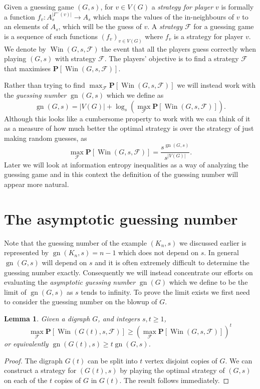 \documentclass[a4paper, 14pt]{extarticle}
\theoremstyle{plain}
\newtheorem{lemma}[proposition]{Lemma}
\def\mc{\mathcal}
\def\mb{\mathbf}
\DeclareMathOperator{\gn}{gn}
\DeclareMathOperator{\Win}{Win}
\begin{document}
Given a guessing game $(G,s)$, for $v\in V(G)$ a \emph{strategy for
player $v$} is formally a function $f_v:A_s^{|\Gamma^-(v)|}\to A_s$
which maps the values of the in-neighbours of $v$ to an elements of $A_s$, which will be the guess of $v$. A
\emph{strategy} $\mc{F}$ for a guessing game is a sequence of such
functions $(f_v)_{v\in V(G)}$ where $f_v$ is a strategy for player
$v$. We denote by $\Win(G,s,\mc{F})$ the event that all the players guess
correctly when playing $(G,s)$ with strategy $\mc{F}$. The players'
objective is to find a strategy $\mc{F}$ that maximises
$\mb{P}[\Win(G,s,\mc{F})]$.

Rather than trying to find $\max_{\mc{F}}\mb{P}[\Win(G,s,\mc{F})]$ we
will instead work with the \emph{guessing number} $\gn(G,s)$ which
we define as
\[
\gn(G,s) = |V(G)|+\log_s
\left(\max_{\mc{F}}\mb{P}[\Win(G,s,\mc{F})]\right).
\]
Although this looks like a cumbersome property to work with we can
think of it as a measure of how much better the optimal strategy is
over the strategy of just making random guesses, as
\[
\max_{\mc{F}}\mb{P}[\Win(G,s,\mc{F})] =
\frac{s^{\gn(G,s)}}{s^{|V(G)|}}.
\]
Later we will look at information entropy inequalities as a way of
analyzing the guessing game and in this context the definition of
the guessing number will appear more natural.

\section{The asymptotic guessing number}\label{Sec:Asymptotic}

Note that the guessing number of the example $(K_n,s)$ we
discussed earlier is represented by $\gn(K_n,s) = n-1$ which does
not depend on $s$. In general $\gn(G,s)$ will depend on $s$ and it
is often extremely difficult to determine the guessing number
exactly. Consequently we will instead concentrate our efforts on
evaluating the \emph{asymptotic guessing number} $\gn(G)$ which we
define to be the limit of $\gn(G,s)$ as $s$ tends to infinity. To
prove the limit exists we first need to consider the guessing number
on the blowup of $G$.

\begin{lemma}\label{Lem:BlowupIneq}
Given a digraph $G$, and integers $s, t\geq 1$,
\[
\max_{\mc{F}}\mb{P}[\Win(G(t),s,\mc{F})] \geq
\left(\max_{\mc{F}}\mb{P}[\Win(G,s,\mc{F})]\right)^t
\]
or equivalently $\gn(G(t),s)\geq t\gn(G,s)$.
\end{lemma}

\begin{proof}
The digraph $G(t)$ can be split into $t$ vertex disjoint copies of
$G$. We can construct a strategy for $(G(t),s)$ by playing the
optimal strategy of $(G,s)$ on each of the $t$ copies of $G$ in
$G(t)$. The result follows immediately.
\end{proof}
\end{document}
